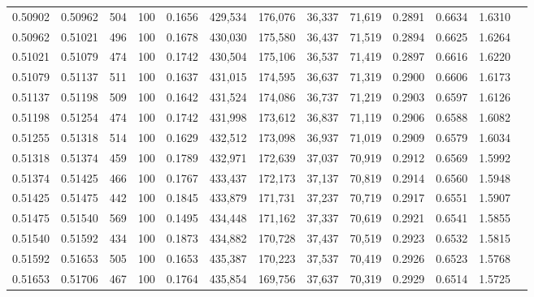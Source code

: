 \begin{tabular}{rrrrrrrrrrrrr}
0.50902 & 0.50962 &   504 & 100 &                                     0.1656 & 429,534 & 176,076 &  36,337 &  71,619 & 0.2891 & 0.6634 & 1.6310 \\
0.50962 & 0.51021 &   496 & 100 &                                     0.1678 & 430,030 & 175,580 &  36,437 &  71,519 & 0.2894 & 0.6625 & 1.6264 \\
0.51021 & 0.51079 &   474 & 100 &                                     0.1742 & 430,504 & 175,106 &  36,537 &  71,419 & 0.2897 & 0.6616 & 1.6220 \\
0.51079 & 0.51137 &   511 & 100 &                                     0.1637 & 431,015 & 174,595 &  36,637 &  71,319 & 0.2900 & 0.6606 & 1.6173 \\
0.51137 & 0.51198 &   509 & 100 &                                     0.1642 & 431,524 & 174,086 &  36,737 &  71,219 & 0.2903 & 0.6597 & 1.6126 \\
0.51198 & 0.51254 &   474 & 100 &                                     0.1742 & 431,998 & 173,612 &  36,837 &  71,119 & 0.2906 & 0.6588 & 1.6082 \\
0.51255 & 0.51318 &   514 & 100 &                                     0.1629 & 432,512 & 173,098 &  36,937 &  71,019 & 0.2909 & 0.6579 & 1.6034 \\
0.51318 & 0.51374 &   459 & 100 &                                     0.1789 & 432,971 & 172,639 &  37,037 &  70,919 & 0.2912 & 0.6569 & 1.5992 \\
0.51374 & 0.51425 &   466 & 100 &                                     0.1767 & 433,437 & 172,173 &  37,137 &  70,819 & 0.2914 & 0.6560 & 1.5948 \\
0.51425 & 0.51475 &   442 & 100 &                                     0.1845 & 433,879 & 171,731 &  37,237 &  70,719 & 0.2917 & 0.6551 & 1.5907 \\
0.51475 & 0.51540 &   569 & 100 &                                     0.1495 & 434,448 & 171,162 &  37,337 &  70,619 & 0.2921 & 0.6541 & 1.5855 \\
0.51540 & 0.51592 &   434 & 100 &                                     0.1873 & 434,882 & 170,728 &  37,437 &  70,519 & 0.2923 & 0.6532 & 1.5815 \\
0.51592 & 0.51653 &   505 & 100 &                                     0.1653 & 435,387 & 170,223 &  37,537 &  70,419 & 0.2926 & 0.6523 & 1.5768 \\
0.51653 & 0.51706 &   467 & 100 &                                     0.1764 & 435,854 & 169,756 &  37,637 &  70,319 & 0.2929 & 0.6514 & 1.5725 \\

\end{tabular}
